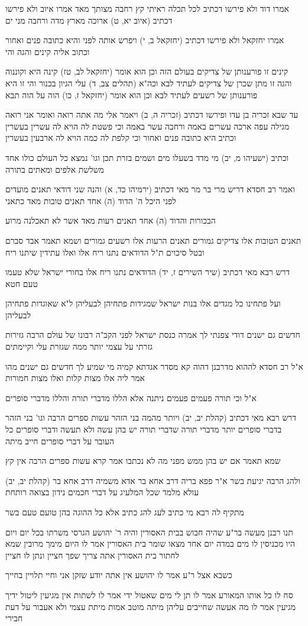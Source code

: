 \documentclass[12pt, openany]{book}
\newcommand{\sethebfont}{
\fontsize{10.5pt}{21.0pt} \selectfont
}
\newcommand{\textblock}[1]{
{\sethebfont #1\\}	
}
\begin{document}
\textblock{אמרו דוד ולא פירשו דכתיב לכל תכלה ראיתי קץ רחבה מצותך מאד אמרו איוב ולא פירשו דכתיב (איוב יא, ט) ארוכה מארץ מדה ורחבה מני ים}
\textblock{אמרו יחזקאל ולא פירשו דכתיב (יחזקאל ב, י) ויפרש אותה לפני והיא כתובה פנים ואחור וכתוב אליה קינים והגה והי}
\textblock{קינים זו פורענותן של צדיקים בעולם הזה וכן הוא אומר (יחזקאל לב, טז) קינה היא וקוננוה והגה זו מתן שכרן של צדיקים לעתיד לבא וכה"א (תהלים צב, ד) עלי הגיון בכנור והי זו היא פורענותן של רשעים לעתיד לבא וכן הוא אומר (יחזקאל ז, כו) הוה על הוה תבא}
\textblock{עד שבא זכריה בן עדו ופירשו דכתיב (זכריה ה, ב) ויאמר אלי מה אתה רואה ואומר אני רואה מגילה עפה ארכה עשרים באמה ורחבה עשר באמה וכי פשטת לה הויא לה עשרין בעשרין וכתיב היא כתובה פנים ואחור וכי קלפת לה כמה הויא לה ארבעין בעשרין}
\textblock{וכתיב (ישעיהו מ, יב) מי מדד בשעלו מים ושמים בזרת תכן וגו' נמצא כל העולם כולו אחד משלשת אלפים ומאתים בתורה}
\textblock{ואמר רב חסדא דריש מרי בר מר מאי דכתיב (ירמיהו כד, א) והנה שני דודאי תאנים מועדים לפני היכל ה' הדוד (ה) אחד תאנים טובות מאד כתאני}
\textblock{הבכורות והדוד (ה) אחד תאנים רעות מאד אשר לא תאכלנה מרוע}
\textblock{תאנים הטובות אלו צדיקים גמורים תאנים הרעות אלו רשעים גמורים ושמא תאמר אבד סברם ובטל סיכוים ת"ל הדודאים נתנו ריח אלו ואלו עתידין שיתנו ריח}
\textblock{דרש רבא מאי דכתיב (שיר השירים ז, יד) הדודאים נתנו ריח אלו בחורי ישראל שלא טעמו טעם חטא}
\textblock{ועל פתחינו כל מגדים אלו בנות ישראל שמגידות פתחיהן לבעליהן ל"א שאוגדות פתחיהן לבעליהן}
\textblock{חדשים גם ישנים דודי צפנתי לך אמרה כנסת ישראל לפני הקב"ה רבונו של עולם הרבה גזירות גזרתי על עצמי יותר ממה שגזרת עלי וקיימתים}
\textblock{א"ל רב חסדא לההוא מדרבנן דהוה קא מסדר אגדתא קמיה מי שמיע לך חדשים גם ישנים מהו אמר ליה אלו מצות קלות ואלו מצות חמורות}
\textblock{א"ל וכי תורה פעמים פעמים ניתנה אלא הללו מדברי תורה והללו מדברי סופרים}
\textblock{דרש רבא מאי דכתיב (קהלת יב, יב) ויותר מהמה בני הזהר עשות ספרים הרבה וגו' בני הזהר בדברי סופרים יותר מדברי תורה שדברי תורה יש בהן עשה ולא תעשה ודברי סופרים כל העובר על דברי סופרים חייב מיתה}
\textblock{שמא תאמר אם יש בהן ממש מפני מה לא נכתבו אמר קרא עשות ספרים הרבה אין קץ}
\textblock{(קהלת יב, יב) ולהג הרבה יגיעת בשר א"ר פפא בריה דרב אחא בר אדא משמיה דרב אחא בר עולא מלמד שכל המלעיג על דברי חכמים נידון בצואה רותחת}
\textblock{מתקיף לה רבא מי כתיב לעג להג כתיב אלא כל ההוגה בהן טועם טעם בשר}
\textblock{תנו רבנן מעשה בר"ע שהיה חבוש בבית האסורין והיה ר' יהושע הגרסי משרתו בכל יום ויום היו מכניסין לו מים במדה יום אחד מצאו שומר בית האסורין אמר לו היום מימך מרובין שמא לחתור בית האסורין אתה צריך שפך חציין ונתן לו חציין}
\textblock{כשבא אצל ר"ע אמר לו יהושע אין אתה יודע שזקן אני וחיי תלויין בחייך}
\textblock{סח לו כל אותו המאורע אמר לו תן לי מים שאטול ידי אמר לו לשתות אין מגיעין ליטול ידיך מגיעין אמר לו מה אעשה שחייבים עליהן מיתה מוטב אמות מיתת עצמי ולא אעבור על דעת חבירי}
\end{document}

